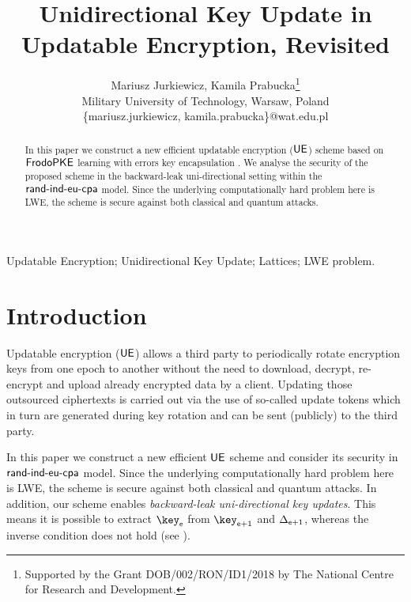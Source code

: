 \documentclass{fundam}
\begin{document}
\title{Unidirectional Key Update in Updatable Encryption, Revisited}

\address{Military University of Technology, Kaliskiego 2 00-908 Warsaw}

\author{Mariusz Jurkiewicz, Kamila Prabucka\thanks{Supported by the Grant DOB/002/RON/ID1/2018 by The National Centre for Research and Development.}\\
	Military University of Technology, Warsaw, Poland\\
	\{mariusz.jurkiewicz, kamila.prabucka\}@wat.edu.pl}

\maketitle


\begin{abstract}
	In this paper we construct a new efficient updatable encryption ($\mathsf{UE}$) scheme based on $\mathsf{FrodoPKE}$ learning with errors key encapsulation \cite{Frodo}. We analyse the security of the proposed scheme in the backward-leak uni-directional setting  within the $\mathsf{rand}{\text{-}}\mathsf{ind}{\text{-}}\mathsf{eu}{\text{-}}\mathsf{cpa}$ model. Since the underlying computationally hard problem here is LWE, the scheme is secure against both classical and quantum attacks. 
\end{abstract}

\begin{keywords}
	Updatable Encryption; Unidirectional Key Update;  Lattices; LWE problem.
\end{keywords}


\section{Introduction}
Updatable encryption ($\mathsf{UE}$) allows a third party to periodically rotate encryption keys from one epoch to another without the need to download, decrypt, re-encrypt and upload already encrypted data by a client. Updating those outsourced ciphertexts is carried out via the use of so-called update tokens which in turn are generated during key rotation and can be sent (publicly) to the third party.

In this paper we construct a new efficient $\mathsf{UE}$ scheme and consider its security in $\mathsf{rand}{\text{-}}\mathsf{ind}{\text{-}}\mathsf{eu}{\text{-}}\mathsf{cpa}$ model. Since the underlying computationally hard problem here is LWE, the scheme is secure against both classical and quantum attacks.  In addition, our scheme enables  \textit{backward-leak uni-directional key updates}. This means it is possible to extract $\key_{\epoch}$ from $\key_{\epoch+1}$ and $\Delta_{\mathsf{e}+1}$, whereas the inverse condition does not hold (see \cite{nishimaki2022direction}).    
\end{document}
